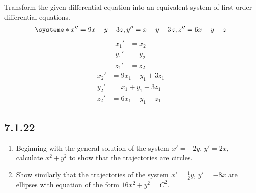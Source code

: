 \documentclass{article}
\begin{document}
Transform the given differential equation into an equivalent system of first-order differential equations.
\begin{align*}
	\systeme*{
		x'' = 9x - y + 3z,
		y'' = x + y - 3z,
		z'' = 6x - y - z
	}
\end{align*}
\begin{align*}
	x_1' & = x_2 \\
	y_1' & = y_2 \\
	z_1' & = z_2
\end{align*}
\begin{align*}
	x_2' & = 9x_1 - y_1 + 3z_1 \\
	y_2' & = x_1 + y_1 - 3z_1 \\
	z_2' & = 6x_1 - y_1 - z_1
\end{align*}

\subsection{7.1.22}

\begin{enumerate}[label = \textbf{(\alph*)}]
	\item Beginning with the general solution of the system $ x' = -2y $, $ y' = 2x $, calculate $ x^2 + y^2 $ to show that the trajectories are circles.
	\item Show similarly that the trajectories of the system $ x' = \frac{1}{2}y $, $ y' = -8x $ are ellipses with equation of the form $ 16x^2 + y^2 = C^2 $.
\end{enumerate}

\hr
\end{document}

